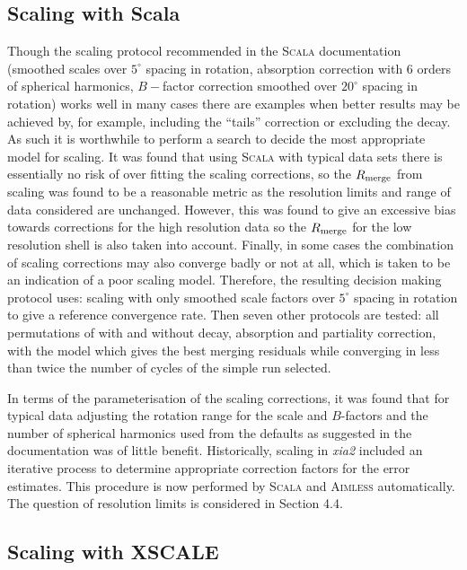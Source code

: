 \documentclass[preprint,pdf]{iucr}
\begin{document}
\subsection{Scaling with Scala}

Though the scaling protocol recommended in the \textsc{Scala} documentation
(smoothed scales over $5^{\circ}$ spacing in rotation, absorption
correction with 6 orders of spherical harmonics, $B-$factor correction
smoothed over $20^{\circ}$ spacing in rotation) works well in many
cases there are examples when better results may be achieved by,
for example, including the ``tails'' correction or excluding the
decay. As such it is worthwhile to perform a search to decide the most
appropriate model for scaling. It was found that using \textsc{Scala}
with typical data sets there is essentially no risk of over fitting
the scaling corrections, so the $R_{\rm{merge}}$ from scaling was found to
be a reasonable metric as the resolution limits and range of data
considered are unchanged. However, this was found to give an excessive
bias towards corrections for the high resolution data so the
$R_{\rm{merge}}$ for the low
resolution shell is also taken into account. Finally, in
some cases the combination of scaling corrections may also converge
badly or not at all, which is taken to be an indication of a poor
scaling model. Therefore, the resulting decision making
protocol uses: scaling with only smoothed scale
factors over $5^{\circ}$ spacing in rotation to give a reference
convergence rate. Then seven other protocols are tested: 
all permutations of with and
without decay, absorption and partiality correction, with the model
which gives the best merging residuals while converging in less than
twice the number of cycles of the simple run selected. 

In terms of the parameterisation of the scaling
corrections, it was found that for
typical data adjusting the rotation range for the scale and
$B$-factors and the number of spherical harmonics used from the
defaults as suggested in the documentation was of little benefit.
Historically, scaling in \emph{xia2} included an iterative process to
determine appropriate correction factors for the error estimates. This
procedure is now performed by \textsc{Scala} and \textsc{Aimless} automatically.
The question of resolution limits is considered in Section 4.4.

\subsection{Scaling with XSCALE}
\end{document}
